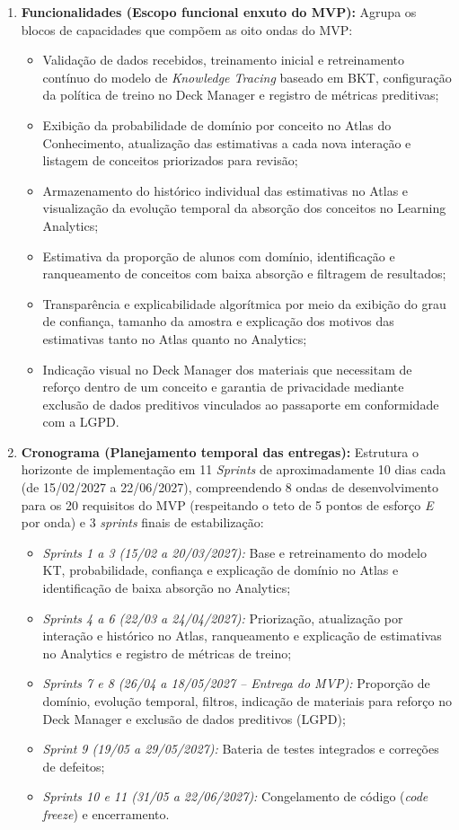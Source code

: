 \begin{enumerate}
    \item \textbf{Funcionalidades (Escopo funcional enxuto do MVP):} Agrupa os blocos de capacidades que compõem as oito ondas do MVP:
    \begin{itemize}
        \item Validação de dados recebidos, treinamento inicial e retreinamento contínuo do modelo de \textit{Knowledge Tracing} baseado em BKT, configuração da política de treino no Deck Manager e registro de métricas preditivas;
        \item Exibição da probabilidade de domínio por conceito no Atlas do Conhecimento, atualização das estimativas a cada nova interação e listagem de conceitos priorizados para revisão;
        \item Armazenamento do histórico individual das estimativas no Atlas e visualização da evolução temporal da absorção dos conceitos no Learning Analytics;
        \item Estimativa da proporção de alunos com domínio, identificação e ranqueamento de conceitos com baixa absorção e filtragem de resultados;
        \item Transparência e explicabilidade algorítmica por meio da exibição do grau de confiança, tamanho da amostra e explicação dos motivos das estimativas tanto no Atlas quanto no Analytics;
        \item Indicação visual no Deck Manager dos materiais que necessitam de reforço dentro de um conceito e garantia de privacidade mediante exclusão de dados preditivos vinculados ao passaporte em conformidade com a LGPD.
    \end{itemize}

    \item \textbf{Cronograma (Planejamento temporal das entregas):} Estrutura o horizonte de implementação em 11 \textit{Sprints} de aproximadamente 10 dias cada (de 15/02/2027 a 22/06/2027), compreendendo 8 ondas de desenvolvimento para os 20 requisitos do MVP (respeitando o teto de 5 pontos de esforço \textit{E} por onda) e 3 \textit{sprints} finais de estabilização:
    \begin{itemize}
        \item \textit{Sprints 1 a 3 (15/02 a 20/03/2027):} Base e retreinamento do modelo KT, probabilidade, confiança e explicação de domínio no Atlas e identificação de baixa absorção no Analytics;
        \item \textit{Sprints 4 a 6 (22/03 a 24/04/2027):} Priorização, atualização por interação e histórico no Atlas, ranqueamento e explicação de estimativas no Analytics e registro de métricas de treino;
        \item \textit{Sprints 7 e 8 (26/04 a 18/05/2027 -- Entrega do MVP):} Proporção de domínio, evolução temporal, filtros, indicação de materiais para reforço no Deck Manager e exclusão de dados preditivos (LGPD);
        \item \textit{Sprint 9 (19/05 a 29/05/2027):} Bateria de testes integrados e correções de defeitos;
        \item \textit{Sprints 10 e 11 (31/05 a 22/06/2027):} Congelamento de código (\textit{code freeze}) e encerramento.
    \end{itemize}


\end{enumerate}
